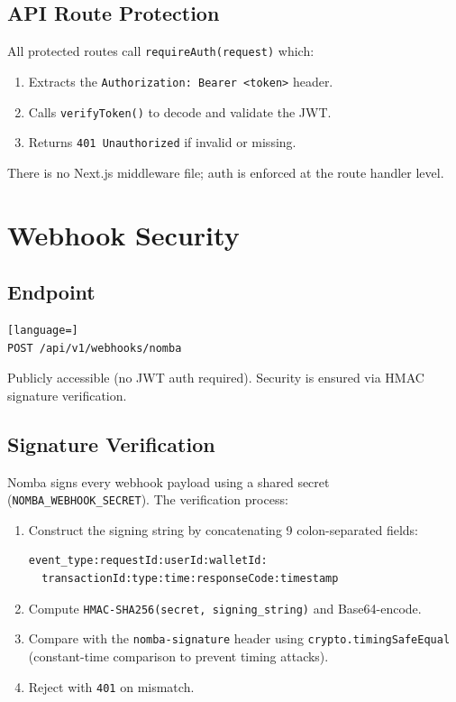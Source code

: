 \documentclass[11pt,a4paper]{article}
\begin{document}
\subsection{API Route Protection}

All protected routes call \texttt{requireAuth(request)} which:
\begin{enumerate}[nosep]
  \item Extracts the \texttt{Authorization: Bearer <token>} header.
  \item Calls \texttt{verifyToken()} to decode and validate the JWT.
  \item Returns \texttt{401 Unauthorized} if invalid or missing.
\end{enumerate}

There is no Next.js middleware file; auth is enforced at the route handler
level.

\section{Webhook Security}

\subsection{Endpoint}

\begin{lstlisting}[language=]
POST /api/v1/webhooks/nomba
\end{lstlisting}

Publicly accessible (no JWT auth required). Security is ensured via HMAC
signature verification.

\subsection{Signature Verification}

Nomba signs every webhook payload using a shared secret
(\texttt{NOMBA\_WEBHOOK\_SECRET}). The verification process:

\begin{enumerate}[nosep]
  \item Construct the signing string by concatenating 9 colon-separated fields:
\begin{lstlisting}
event_type:requestId:userId:walletId:
  transactionId:type:time:responseCode:timestamp
\end{lstlisting}
  \item Compute \texttt{HMAC-SHA256(secret, signing\_string)} and Base64-encode.
  \item Compare with the \texttt{nomba-signature} header using
        \texttt{crypto.timingSafeEqual} (constant-time comparison to
        prevent timing attacks).
  \item Reject with \texttt{401} on mismatch.
\end{enumerate}
\end{document}
